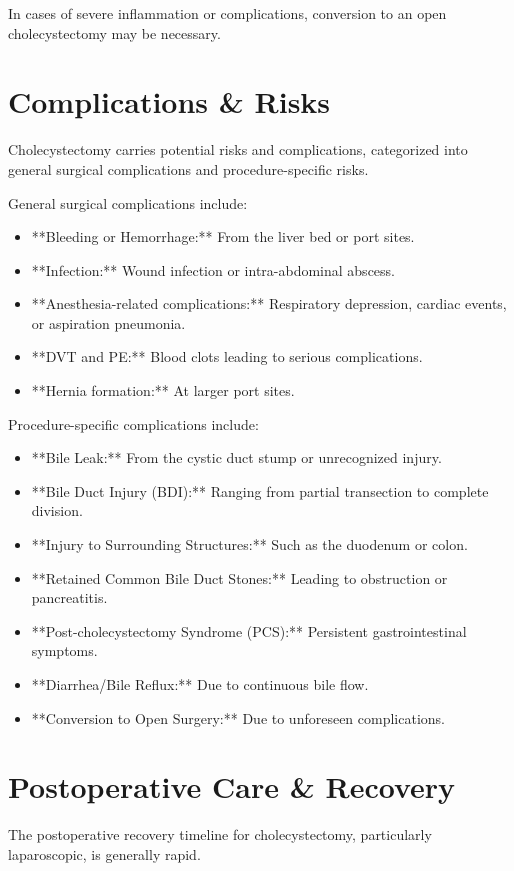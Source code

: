 In cases of severe inflammation or complications, conversion to an open cholecystectomy may be necessary.

\section*{Complications \& Risks}
Cholecystectomy carries potential risks and complications, categorized into general surgical complications and procedure-specific risks.

General surgical complications include:

\begin{itemize}
  \item **Bleeding or Hemorrhage:** From the liver bed or port sites.
  \item **Infection:** Wound infection or intra-abdominal abscess.
  \item **Anesthesia-related complications:** Respiratory depression, cardiac events, or aspiration pneumonia.
  \item **DVT and PE:** Blood clots leading to serious complications.
  \item **Hernia formation:** At larger port sites.
\end{itemize}

Procedure-specific complications include:

\begin{itemize}
  \item **Bile Leak:** From the cystic duct stump or unrecognized injury.
  \item **Bile Duct Injury (BDI):** Ranging from partial transection to complete division.
  \item **Injury to Surrounding Structures:** Such as the duodenum or colon.
  \item **Retained Common Bile Duct Stones:** Leading to obstruction or pancreatitis.
  \item **Post-cholecystectomy Syndrome (PCS):** Persistent gastrointestinal symptoms.
  \item **Diarrhea/Bile Reflux:** Due to continuous bile flow.
  \item **Conversion to Open Surgery:** Due to unforeseen complications.
\end{itemize}

\section*{Postoperative Care \& Recovery}
The postoperative recovery timeline for cholecystectomy, particularly laparoscopic, is generally rapid. 

